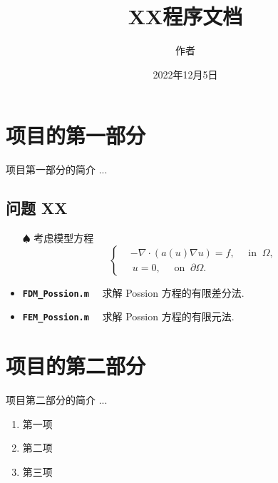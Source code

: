 \documentclass[11pt]{article}
\title{XX程序文档}
\author{作者}
\date{2022年12月5日}
\numberwithin{equation}{section}
\newcommand{\textcode}[1]{\textcolor{winered}{\bfseries\texttt{#1}}~~}
\begin{document}
\maketitle



\section{项目的第一部分}

项目第一部分的简介 ...


\subsection{问题 XX}

\begin{itemize}

\item [$\spadesuit$] 考虑模型方程
\begin{equation}\label{eq:NLPossion4}
\left\{
\begin{aligned}
&-\nabla \cdot(a(u) \nabla u) = f,\quad \text{ in } ~\Omega, \\
&~u = 0, \quad \text{ on } ~ \partial \Omega.
\end{aligned}\right.
\end{equation}

\item \textcode{FDM\_Possion.m} 求解 Possion 方程的有限差分法.

\item \textcode{FEM\_Possion.m} 求解 Possion 方程的有限元法.

\end{itemize}



\section{项目的第二部分}

项目第二部分的简介 ...

\begin{enumerate}
  \item 第一项
  \item 第二项
  \item 第三项
\end{enumerate}
\end{document}

